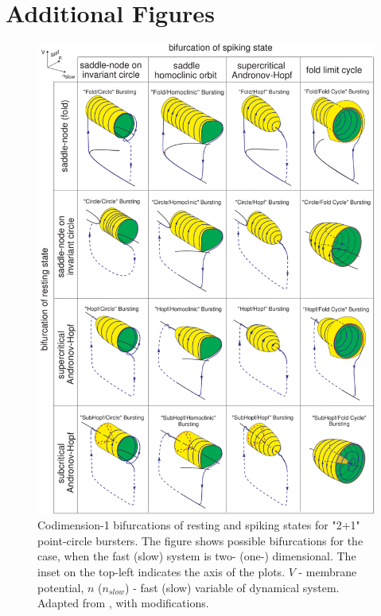 \documentclass[../main.tex]{subfiles}
\begin{document}
\section{Additional Figures}

\begin{figure}[!b]
    \centering
    \includegraphics[width=0.75\linewidth]{../img/modelling_r5/examples/point_circle_bursters.png}
    \caption[Codimension-1 bifurcations of resting and spiking states for "2+1" point-circle bursters.]{
        Codimension-1 bifurcations of resting and spiking states for "2+1" point-circle bursters.
        The figure shows possible bifurcations for the case, when the fast (slow) system is
        two- (one-) dimensional. The inset on the top-left indicates the axis of the plots.
        $V$ - membrane potential, $n$ ($n_{slow}$) - fast (slow) variable of dynamical system.
        Adapted from \cite{izhikevichDynamicalSystemsNeuroscience2006}, with modifications.
    }
    \label{fig:izhikevich_point_circle_bursters}
\end{figure}
\end{document}
